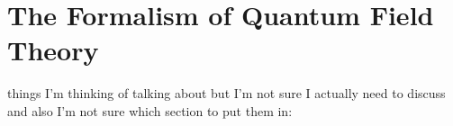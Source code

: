 %
%
%
%
%
%

\section{The Formalism of Quantum Field Theory}
    things I'm thinking of talking about but I'm not sure I actually need to discuss and also I'm not sure which section to put them in:

